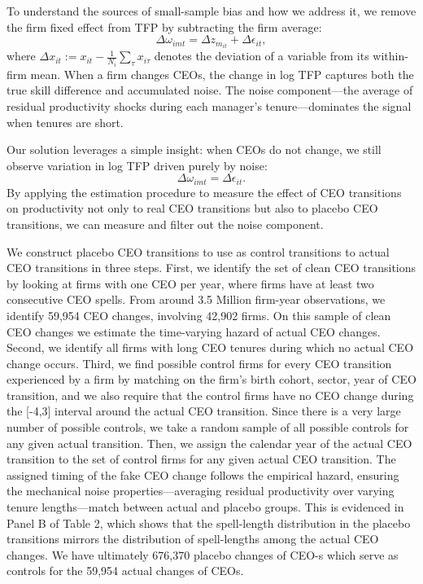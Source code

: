 \documentclass[11pt,a4paper]{article}
\begin{document}
To understand the sources of small-sample bias and how we address it, we remove the firm fixed effect from TFP by subtracting the firm average:
\begin{equation}
\Delta\omega_{imt} = \Delta z_{m_{it}} + \Delta\epsilon_{it},
\end{equation}
where $\Delta x_{it} := x_{it} - \frac{1}{N_i}\sum_{\tau} x_{i\tau}$ denotes the deviation of a variable from its within-firm mean. When a firm changes CEOs, the change in log TFP captures both the true skill difference and accumulated noise. The noise component---the average of residual productivity shocks during each manager's tenure---dominates the signal when tenures are short. 

Our solution leverages a simple insight: when CEOs do not change, we still observe variation in log TFP driven purely by noise:
\begin{equation}
\Delta\omega_{imt} = \Delta\epsilon_{it}.
\end{equation}
By applying the estimation procedure to measure the effect of CEO transitions on productivity not only to real CEO transitions but also to placebo CEO transitions, we can measure and filter out the noise component.

We construct placebo CEO transitions to use as control transitions to actual CEO transitions in three steps. First, we identify the set of clean CEO transitions by looking at firms with one CEO per year, where firms have at least two consecutive CEO spells. From around 3.5 Million firm-year observations, we identify 59,954 CEO changes, involving 42,902 firms. On this sample of clean CEO changes we estimate the time-varying hazard of actual CEO changes. Second, we identify all firms with long CEO tenures during which no actual CEO change occurs. Third, we find possible control firms for every CEO transition experienced by a firm by matching on the firm's birth cohort, sector, year of CEO transition, and we also require that the control firms have no CEO change during the [-4,3] interval around the actual CEO transition. Since there is a very large number of possible controls, we take a random sample of all possible controls for any given actual transition. Then, we assign the calendar year of the actual CEO transition to the set of control firms for any given actual CEO transition. The assigned timing of the fake
CEO change follows the empirical hazard, ensuring the mechanical noise properties—averaging
residual productivity over varying tenure lengths—match between actual and placebo groups. This is evidenced in Panel B of Table 2, which shows that the spell-length distribution in the placebo transitions mirrors the distribution of spell-lengths among the actual CEO changes. We have ultimately 676,370 placebo changes of CEO-s which serve as controls for the 59,954 actual changes of CEOs.
\end{document}
